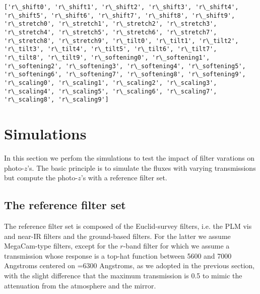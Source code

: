 \documentclass[11pt]{article}
\begin{document}
    \begin{Verbatim}[commandchars=\\\{\}]
['r\_shift0', 'r\_shift1', 'r\_shift2', 'r\_shift3', 'r\_shift4', 'r\_shift5', 'r\_shift6', 'r\_shift7', 'r\_shift8', 'r\_shift9', 'r\_stretch0', 'r\_stretch1', 'r\_stretch2', 'r\_stretch3', 'r\_stretch4', 'r\_stretch5', 'r\_stretch6', 'r\_stretch7', 'r\_stretch8', 'r\_stretch9', 'r\_tilt0', 'r\_tilt1', 'r\_tilt2', 'r\_tilt3', 'r\_tilt4', 'r\_tilt5', 'r\_tilt6', 'r\_tilt7', 'r\_tilt8', 'r\_tilt9', 'r\_softening0', 'r\_softening1', 'r\_softening2', 'r\_softening3', 'r\_softening4', 'r\_softening5', 'r\_softening6', 'r\_softening7', 'r\_softening8', 'r\_softening9', 'r\_scaling0', 'r\_scaling1', 'r\_scaling2', 'r\_scaling3', 'r\_scaling4', 'r\_scaling5', 'r\_scaling6', 'r\_scaling7', 'r\_scaling8', 'r\_scaling9']

    \end{Verbatim}

    \section{Simulations}\label{simulations}

In this section we perfom the simulations to test the impact of filter
varations on photo-\(z\)'s. The basic principle is to simulate the
fluxes with varying transmissions but compute the photo-\(z\)'s with a
reference filter set.

\subsection{The reference filter set}\label{the-reference-filter-set}

The reference filter set is composed of the Euclid-survey filters, i.e.
the PLM vis and near-IR filters and the ground-based filters. For the
latter we assume MegaCam-type filters, except for the \(r\)-band filter
for which we assume a transmission whose response is a top-hat function
between 5600 and 7000 Angstroms centered on =6300 Angstroms, as we
adopted in the previous section, with the slight difference that the
maximum transmission is 0.5 to mimic the attenuation from the atmosphere
and the mirror.
\end{document}
